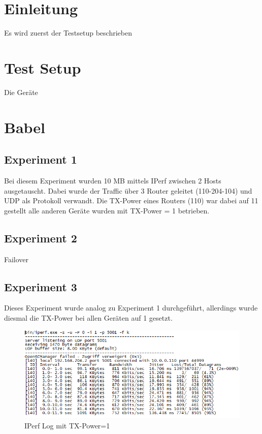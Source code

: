\documentclass[10pt]{scrartcl}
\author{André Harms, Oliver Steenbuck}
\title{\titletext}
\date{09.11.2011}
\begin{document}
\maketitle

\setcounter{tocdepth}{3}
\tableofcontents

	\listoftables                                 												%
	\listoffigures   

\section{Einleitung}
 Es wird zuerst der Testsetup beschrieben

\section{Test Setup}
	Die Geräte 

\section{Babel}
	\subsection{Experiment 1}
	Bei diesem Experiment wurden 10 MB mittels IPerf zwischen 2 Hosts ausgetauscht. Dabei wurde der Traffic über 3 Router geleitet (110-204-104) und UDP als Protokoll verwandt. Die TX-Power eines Routers (110) war dabei auf 11 gestellt alle anderen Geräte wurden mit TX-Power = 1 betrieben.
	
	\subsection{Experiment 2}
	Failover	
	
	\subsection{Experiment 3}
	Dieses Experiment wurde analog zu Experiment 1 durchgeführt, allerdings wurde diesmal die TX-Power bei allen Geräten auf 1 gesetzt.
	\begin{figure}[H]
        \centering
                \includegraphics[width=\textwidth]{img/Babel_TX1_Protokoll}
        \caption{IPerf Log mit TX-Power=1}
        \label{img:babel_iperf_tx1}
	\end{figure}
	
\end{document}

